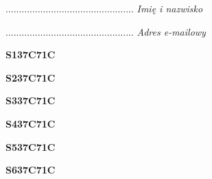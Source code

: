 \begin{turn}{90}\begin{minipage}{\linewidth} \vspace{20mm} ................................................  \textit{Imię i nazwisko}\end{minipage}\end{turn}

\begin{turn}{90}\begin{minipage}{\linewidth} \vspace{20mm} ................................................  \textit{Adres e-mailowy}\end{minipage}\end{turn}

\begin{turn}{90}\huge \begin{minipage}{\linewidth} \vspace{10mm}\textbf{S137C71C}\end{minipage}\end{turn}

\begin{turn}{90}\huge \begin{minipage}{\linewidth} \vspace{10mm}\textbf{S237C71C}\end{minipage}\end{turn}

\begin{turn}{90}\huge \begin{minipage}{\linewidth} \vspace{10mm}\textbf{S337C71C}\end{minipage}\end{turn}

\begin{turn}{90}\huge \begin{minipage}{\linewidth} \vspace{10mm}\textbf{S437C71C}\end{minipage}\end{turn}

\begin{turn}{90}\huge \begin{minipage}{\linewidth} \vspace{10mm}\textbf{S537C71C}\end{minipage}\end{turn}

\begin{turn}{90}\huge \begin{minipage}{\linewidth} \vspace{10mm}\textbf{S637C71C}\end{minipage}\end{turn}

